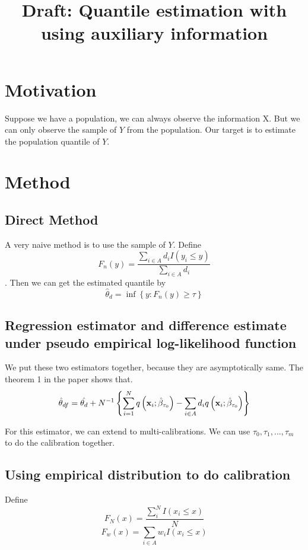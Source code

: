 \documentclass[]{article}
\title{Draft: Quantile estimation with using auxiliary information}
\begin{document}
\maketitle

\section{Motivation}
Suppose we have a population, we can always observe the information X. But we can only observe the sample of $Y$ from the population. Our target is to estimate the population quantile of $Y$.

\section{Method}
\subsection{Direct Method}
A very naive method is to use the sample of $Y$. Define $$F_n(y)=\frac{\sum_{i\in A} d_i I\left(y_i\leq y \right) }{\sum_{i\in A}d_i}$$. 
Then we can get the estimated quantile by $$\hat \theta_d=\inf\left\lbrace y:F_n(y)\geq \tau \right\rbrace $$

\subsection{Regression estimator and difference estimate under pseudo empirical log-likelihood function}

We put these two estimators together, because they are asymptotically same. The theorem 1 in the paper shows that. $$\hat \theta_{df}=\hat{\theta_d}+N^{-1}\left\lbrace \sum_{i=1}^{N} q\left(\textbf x_i;\hat\beta_{\tau_0}\right) - \sum_{i\in A} d_i q\left(\textbf x_i;\hat\beta_{\tau_0} \right) \right\rbrace $$

For this estimator, we can extend to multi-calibrations. We can use $\tau_0,\tau_1,...,\tau_m$ to do the calibration together.

\subsection{Using empirical distribution to do calibration}
Define $$F_N(x)=\frac{\sum_{i}^{N}I(x_i \leq x)}{N}$$
$$F_w(x)=\sum_{i\in A} w_i I(x_i \leq x) $$
\end{document}
